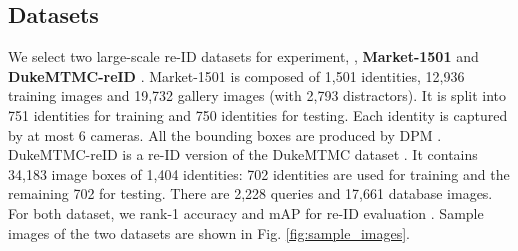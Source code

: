 \documentclass[10pt,twocolumn,letterpaper]{article}
\begin{document}
\subsection{Datasets}
We select two large-scale re-ID datasets for experiment, \ie, \textbf{Market-1501} \cite{DBLP:conf/iccv/ZhengSTWWT15} and \textbf{DukeMTMC-reID} \cite{ristani2016MTMC,zheng2017unlabeled}.  Market-1501  is composed of 1,501 identities, 12,936 training images and 19,732 gallery images (with 2,793 distractors). It is split into 751 identities for training and 750 identities for testing. Each identity is captured by at most 6 cameras. All the bounding boxes are produced by DPM \cite{felzenszwalb2008discriminatively}.  DukeMTMC-reID is a re-ID version of the DukeMTMC dataset \cite{ristani2016MTMC}. 
It contains 34,183 image boxes of 1,404 identities: 702 identities are used for training and the remaining 702 for testing. There are 2,228 queries and 17,661 database images. For both dataset, we rank-1 accuracy and mAP for re-ID evaluation \cite{DBLP:conf/iccv/ZhengSTWWT15}. Sample images of the two datasets are shown in Fig. \ref{fig:sample_images}.
\end{document}
